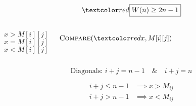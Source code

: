\begin{frame}
  \[
    \red{\boxed{W(n) \ge 2n - 1}}
  \]

  \pause
  \begin{columns}
      \centerline{}
	  \[
		x > M[i][j]
	  \]
	  \[
		x = M[i][j]
	  \]
	  \[
		x < M[i][j]
	  \]
      \centerline{}
      \[
		\textsc{Compare}(\red{x}, M[i][j])
      \]
  \end{columns}

  \pause
  \vspace{0.50cm}
  \[
    \text{Diagonals: } i + j = n - 1 \quad\&\quad i + j = n
  \]

  \pause
  \begin{center}
	{}
  \end{center}

  \pause
  \vspace{-0.30cm}
  \begin{align*}
    i + j \le n - 1 &\implies x > M_{ij} \\
    i + j > n - 1 &\implies x < M_{ij} \\
  \end{align*}
\end{frame}
